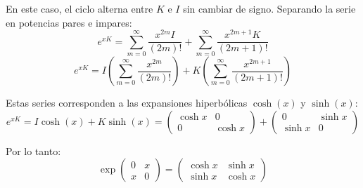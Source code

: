 \documentclass[11pt,spanish]{article}
\begin{document}
\begin{itemize}
En este caso, el ciclo alterna entre $K$ e $I$ sin cambiar de signo. Separando la serie en potencias pares e impares:
$$e^{xK} = \sum_{m=0}^{\infty} \frac{x^{2m} I}{(2m)!} + \sum_{m=0}^{\infty} \frac{x^{2m+1} K}{(2m+1)!}$$
$$e^{xK} = I \left( \sum_{m=0}^{\infty} \frac{x^{2m}}{(2m)!} \right) + K \left( \sum_{m=0}^{\infty} \frac{x^{2m+1}}{(2m+1)!} \right)$$

Estas series corresponden a las expansiones hiperbólicas $\cosh(x)$ y $\sinh(x)$:
$$e^{xK} = I \cosh(x) + K \sinh(x) = \begin{pmatrix} \cosh x & 0 \\ 0 & \cosh x \end{pmatrix} + \begin{pmatrix} 0 & \sinh x \\ \sinh x & 0 \end{pmatrix}$$

Por lo tanto:
$$\exp\begin{pmatrix}0 & x \\ x & 0\end{pmatrix} = \begin{pmatrix} \cosh x & \sinh x \\ \sinh x & \cosh x \end{pmatrix}$$

\end{itemize}

%
%
\end{document}
